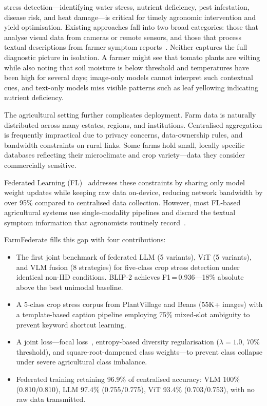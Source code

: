 \documentclass[conference]{IEEEtran}
\begin{document}
 stress detection---identifying water stress, nutrient
deficiency, pest infestation, disease risk, and heat damage---is critical
for timely agronomic intervention and yield optimisation. Existing approaches
fall into two broad categories: those that analyse visual data from cameras
or remote sensors, and those that process textual descriptions from farmer
symptom reports~\cite{Mohanty2016,Ferentinos2018}. Neither captures the
full diagnostic picture in isolation. A farmer might see that tomato plants
are wilting while also noting that soil moisture is below threshold and
temperatures have been high for several days; image-only models cannot
interpret such contextual cues, and text-only models miss visible patterns
such as leaf yellowing indicating nutrient deficiency.

The agricultural setting further complicates deployment. Farm data is
naturally distributed across many estates, regions, and institutions.
Centralised aggregation is frequently impractical due to privacy concerns,
data-ownership rules, and bandwidth constraints on rural links. Some farms
hold small, locally specific databases reflecting their microclimate and
crop variety---data they consider commercially sensitive.

Federated Learning (FL)~\cite{McMahan2017} addresses these constraints by
sharing only model weight updates while keeping raw data on-device, reducing
network bandwidth by over 95\% compared to centralised data collection.
However, most FL-based agricultural systems use single-modality pipelines
and discard the textual symptom information that agronomists routinely
record~\cite{Kumar2024,Aggarwal2023,Li2025}.

FarmFederate fills this gap with four contributions:
\begin{itemize}
  \item The first joint benchmark of federated LLM (5 variants), ViT
        (5 variants), and VLM fusion (8 strategies) for five-class crop
        stress detection under identical non-IID conditions. BLIP-2
        achieves F1\,=\,0.936---18\% absolute above the best unimodal
        baseline.
  \item A 5-class crop stress corpus from PlantVillage and Beans (55K+
        images) with a template-based caption pipeline employing 75\%
        mixed-slot ambiguity to prevent keyword shortcut learning.
  \item A joint loss---focal loss~\cite{Lin2017}, entropy-based diversity
        regularisation ($\lambda{=}1.0$, 70\% threshold), and
        square-root-dampened class weights---to prevent class collapse
        under severe agricultural class imbalance.
  \item Federated training retaining 96.9\% of centralised accuracy:
        VLM 100\% (0.810/0.810), LLM 97.4\% (0.755/0.775), ViT 93.4\%
        (0.703/0.753), with no raw data transmitted.
\end{itemize}
\end{document}
